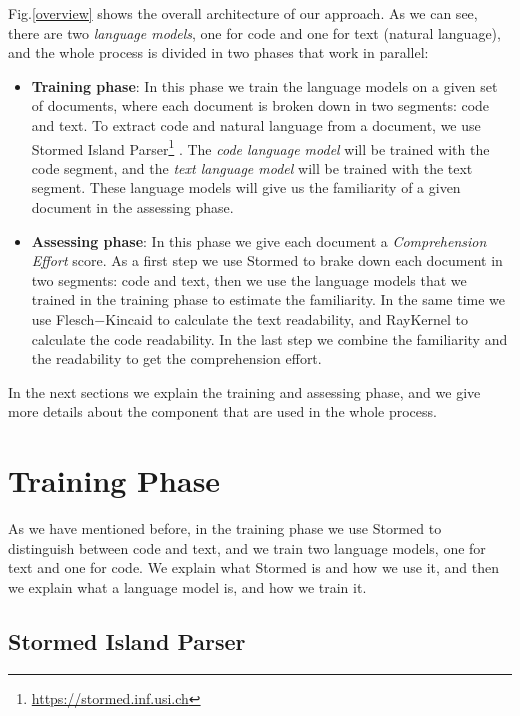 \documentclass[12pt,mscthesis]{usiinfthesis}
\begin{document}
	Fig.\ref{overview} shows the overall architecture of our approach. As we can see, there are two \emph{language models}, one for code and one for text (natural language), and the whole process is divided in two phases that work in parallel: 
	\begin{itemize}

		\item \textbf{Training phase}: In this phase we train the language models on a given set of documents, where each document is broken down in two segments: code and text. To extract code and natural language from a document, we use Stormed Island Parser\footnote{\url{https://stormed.inf.usi.ch}} \cite{Ponz2015a}. The \emph{code language model} will be trained with the code segment, and the \emph{text language model} will be trained with the text segment. These language models will give us the familiarity of a given document in the assessing phase.


		\item \textbf{Assessing phase}: In this phase we give each document a \emph{Comprehension Effort} score. As a first step we use Stormed \cite{Ponz2015a} to brake down each document in two segments: code and text, then we use the language models that we trained in the training phase to estimate the familiarity. In the same time we use Flesch$-$Kincaid\cite{Kincaid} to calculate the text readability, and RayKernel \cite{Buse:2010:LMC:1850489.1850615} to calculate the code readability. In the last step we combine the familiarity and the readability to get the comprehension effort.
	
	\end{itemize}

	In the next sections we explain the training and assessing phase, and we give more details about the component that are used in the whole process.

	\section{Training Phase}

	As we have mentioned before, in the training phase we use Stormed to distinguish between code and text, and we train two language models, one for text and one for code. We explain what Stormed is and how we use it, and then we explain what a language model is, and how we train it.

	\subsection{Stormed Island Parser}
	
\end{document}
